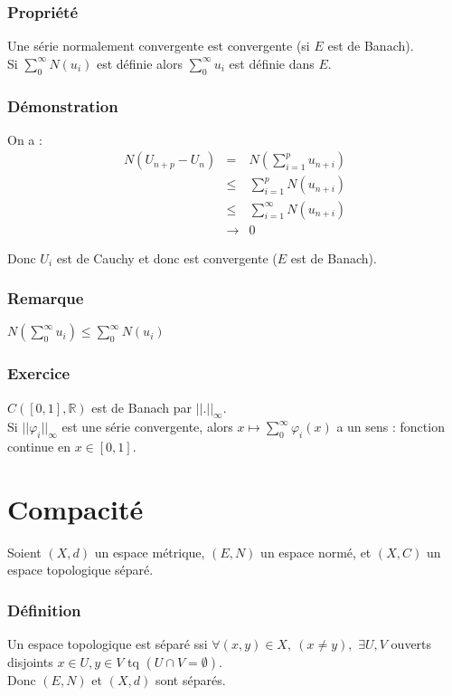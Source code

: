 \documentclass[a4paper, oneside]{report}
\newcommand{\R}{\mathbb{R}}
\newcommand{\et}{espace topologique }
\begin{document}
\subsubsection{Propriété}
Une série normalement convergente est convergente (si $E$ est de Banach).\\
Si $\sum_{0}^\infty N(u_i)$ est définie alors $\sum_{0}^\infty u_i$ est définie dans $E$.

\subsubsection{Démonstration}
On a :
$$\begin{array}{lll}
N(U_{n+p}-U_n)&=&N(\sum_{i=1}^p u_{n+i})\\
&\leq & \sum_{i=1}^p N(u_{n+i})\\
&\leq & \sum_{i=1}^\infty N(u_{n+i})\\
&\rightarrow & 0
\end{array}$$

Donc $U_i$ est de Cauchy et donc est convergente ($E$ est de Banach).

\subsubsection{Remarque}
$N(\sum_{0}^\infty u_i) \leq \sum_{0}^\infty N(u_i)$

\subsubsection{Exercice}
$C([0,1], \R)$ est de Banach par $||.||_\infty$.\\
Si $||\varphi_i||_\infty$ est une série convergente, alors $x\mapsto \sum_{0}^\infty \varphi_i(x)$ a un sens : fonction continue en $x\in [0,1]$.

\section{Compacité}

Soient $(X,d)$ un espace métrique, $(E,N)$ un espace normé, et $(X,C)$ un espace topologique séparé.\\

\subsubsection{Définition}
Un \et est séparé ssi $\forall (x,y)\in X,~(x\neq y),$ $\exists U,V$ ouverts disjoints $x\in U, y\in V$ tq $(U\cap V = \emptyset)$.\\
Donc $(E,N)$ et $(X,d)$ sont séparés.
\end{document}
